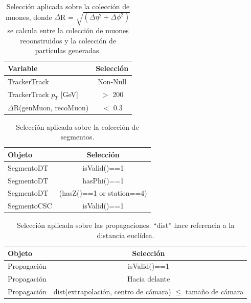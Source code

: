 \begin{table}[htbp]
  \begin{center}
    {\normalsize
      \begin{tabular} {lc}
        \hline
        \hline
        Variable & Selecci\'on \\
        \hline
        TrackerTrack                          & Non-Null      \\
        TrackerTrack $p_{T}$ [GeV]            & $>$ 200       \\
        $\Delta$R(genMuon, recoMuon)          & $<$ 0.3       \\
        \hline
      \end{tabular}
    }
    \caption{Selecci\'on aplicada sobre la colecci\'on de muones, donde $\Delta$R = $\sqrt{(\Delta\eta^{2}+\Delta\phi^{2})}$ se calcula entre la colecci\'on de muones reoonstruidos y la colecci\'on de part\'iculas generadas.}
    \label{tab:muon_sel}
  \end{center}
\end{table}


\begin{table}[htbp]
  \begin{center}
    {\normalsize
      \begin{tabular} {lc}
        \hline
        \hline
        Objeto & Selecci\'on \\
        \hline
        SegmentoDT            & isValid()==1      \\
        SegmentoDT            & hasPhi()==1       \\
        SegmentoDT            & (hasZ()==1 or station==4)   \\
        SegmentoCSC           & isValid()==1      \\
        \hline
      \end{tabular}
    }
    \caption{Selecci\'on aplicada sobre la colecci\'on de segmentos.}
    \label{tab:segment_sel}
  \end{center}
\end{table}


\begin{table}[htbp]
  \begin{center}
    {\normalsize
      \begin{tabular} {lc}
        \hline
        \hline
        Objeto & Selecci\'on \\
        \hline
        Propagaci\'on          & isValid()==1                                                                 \\
        Propagaci\'on          & Hacia delante                                                                \\
        Propagaci\'on          & dist(extrapolaci\'on, centro de c\'amara) $\leq$ tama\~no de c\'amara      \\
        \hline
      \end{tabular}
    }
    \caption{Selecci\'on aplicada sobre las propagaciones. ``dist'' hace referencia a la distancia eucl\'idea.}
    \label{tab:prop_sel}
  \end{center}
\end{table}




